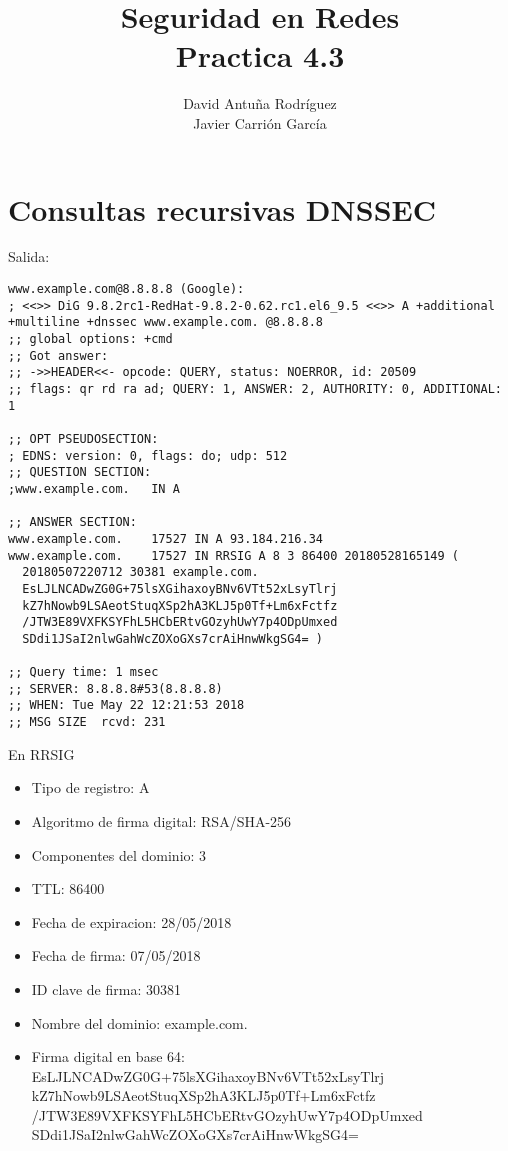 \documentclass[11pt]{article}
\title{\Large Seguridad en Redes\\Practica 4.3}
\author{David Antuña Rodríguez\\Javier Carrión García}
\date{}
\begin{document}
\raggedright

\maketitle
\newpage

\section{Consultas recursivas DNSSEC}

Salida:

\begin{lstlisting}
www.example.com@8.8.8.8 (Google):
; <<>> DiG 9.8.2rc1-RedHat-9.8.2-0.62.rc1.el6_9.5 <<>> A +additional +multiline +dnssec www.example.com. @8.8.8.8
;; global options: +cmd
;; Got answer:
;; ->>HEADER<<- opcode: QUERY, status: NOERROR, id: 20509
;; flags: qr rd ra ad; QUERY: 1, ANSWER: 2, AUTHORITY: 0, ADDITIONAL: 1

;; OPT PSEUDOSECTION:
; EDNS: version: 0, flags: do; udp: 512
;; QUESTION SECTION:
;www.example.com.	IN A

;; ANSWER SECTION:
www.example.com.	17527 IN A 93.184.216.34
www.example.com.	17527 IN RRSIG A 8 3 86400 20180528165149 (
  20180507220712 30381 example.com.
  EsLJLNCADwZG0G+75lsXGihaxoyBNv6VTt52xLsyTlrj
  kZ7hNowb9LSAeotStuqXSp2hA3KLJ5p0Tf+Lm6xFctfz
  /JTW3E89VXFKSYFhL5HCbERtvGOzyhUwY7p4ODpUmxed
  SDdi1JSaI2nlwGahWcZOXoGXs7crAiHnwWkgSG4= )

;; Query time: 1 msec
;; SERVER: 8.8.8.8#53(8.8.8.8)
;; WHEN: Tue May 22 12:21:53 2018
;; MSG SIZE  rcvd: 231
\end{lstlisting}

\medskip

En RRSIG
\begin{itemize}
  \item Tipo de registro: A
  \item Algoritmo de firma digital: RSA/SHA-256
  \item Componentes del dominio: 3
  \item TTL: 86400
  \item Fecha de expiracion: 28/05/2018
  \item Fecha de firma: 07/05/2018
  \item ID clave de firma: 30381
  \item Nombre del dominio: example.com.
  \item Firma digital en base 64:\\
    EsLJLNCADwZG0G+75lsXGihaxoyBNv6VTt52xLsyTlrj
    kZ7hNowb9LSAeotStuqXSp2hA3KLJ5p0Tf+Lm6xFctfz
    /JTW3E89VXFKSYFhL5HCbERtvGOzyhUwY7p4ODpUmxed
    SDdi1JSaI2nlwGahWcZOXoGXs7crAiHnwWkgSG4=
\end{itemize}
\end{document}
